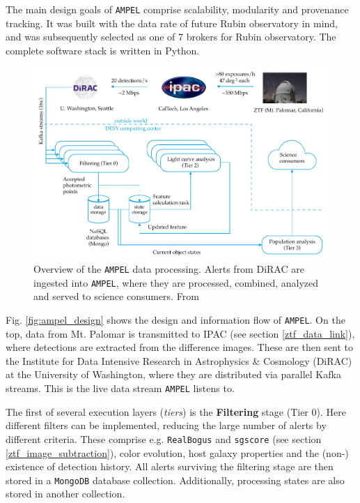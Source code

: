 \documentclass[
    a4paper, %
    fontsize=10pt, %
    twoside=true, %
    numbers=noenddot, %
    fontmethod=tex,
]{kaobook}
\begin{document}
The main design goals of \texttt{AMPEL} comprise scalability, modularity and provenance tracking. It was built with the data rate of future Rubin observatory  in mind, and was subsequently selected as one of 7 brokers for Rubin observatory. The complete software stack is written in Python.


\begin{figure}[h!]
    \includegraphics{fu/ampel_design.pdf}
    \caption[\texttt{AMPEL} overview]{Overview of the \texttt{AMPEL} data processing. Alerts from DiRAC are ingested into \texttt{AMPEL}, where they are processed, combined, analyzed and served to science consumers. From \cite{Nordin2019}}
\end{figure}

Fig. \ref{fig:ampel_design} shows the design and information flow of \texttt{AMPEL}. On the top, data from Mt. Palomar is transmitted to IPAC (see section \ref{ztf_data_link}), where detections are extracted from the difference images. These are then sent to the Institute for Data Intensive Research in Astrophysics \& Cosmology (DiRAC) at the University of Washington, where they are distributed via parallel Kafka streams. This is the live data stream \texttt{AMPEL} listens to.

The first of several execution layers (\textit{tiers}) is the \textbf{Filtering} stage (Tier 0). Here different filters can be implemented, reducing the large number of alerts by different criteria. These comprise e.g. \texttt{RealBogus} and \texttt{sgscore} (see section \ref{ztf_image_subtraction}), color evolution, host galaxy properties and the (non-) existence of detection history. All alerts surviving the filtering stage are then stored in a \texttt{MongoDB} database collection. Additionally, processing states are also stored in another collection.
\end{document}
